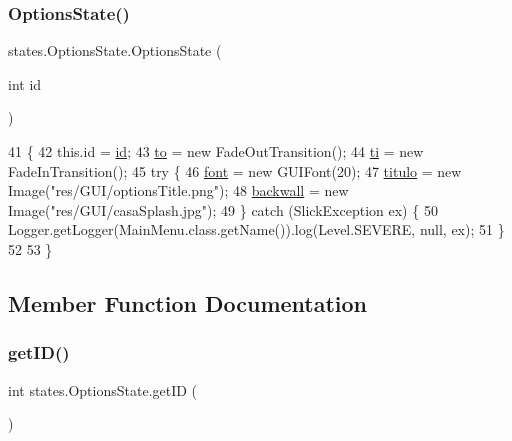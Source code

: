\subsubsection{\texorpdfstring{Options\+State()}{OptionsState()}}
{\footnotesize\ttfamily states.\+Options\+State.\+Options\+State (\begin{DoxyParamCaption}\item[{int}]{id }\end{DoxyParamCaption})\hspace{0.3cm}{\ttfamily [inline]}}


\begin{DoxyCode}
41                                 \{
42         this.\textcolor{keywordtype}{id} = \mbox{\hyperlink{classstates_1_1_options_state_a55f5f77b21511b9bb3a1c306bf81c091}{id}};
43         \mbox{\hyperlink{classstates_1_1_options_state_a2aed557634da4727c19dd8f0e90af333}{to}} = \textcolor{keyword}{new} FadeOutTransition();
44         \mbox{\hyperlink{classstates_1_1_options_state_a0b8ab7b471d09e2aa1d6e1026ed7a634}{ti}} = \textcolor{keyword}{new} FadeInTransition();
45         \textcolor{keywordflow}{try} \{
46             \mbox{\hyperlink{classstates_1_1_options_state_a6a6834f7d7a3704e0a42aac50a50ae3f}{font}} = \textcolor{keyword}{new} GUIFont(20);
47             \mbox{\hyperlink{classstates_1_1_options_state_af4b29604629c41f9baeabdde2d2daec2}{titulo}} = \textcolor{keyword}{new} Image(\textcolor{stringliteral}{"res/GUI/optionsTitle.png"});
48             \mbox{\hyperlink{classstates_1_1_options_state_a258584e2d75daa51de1788b6791cb3f7}{backwall}} = \textcolor{keyword}{new} Image(\textcolor{stringliteral}{"res/GUI/casaSplash.jpg"});
49         \} \textcolor{keywordflow}{catch} (SlickException ex) \{
50             Logger.getLogger(MainMenu.class.getName()).log(Level.SEVERE, null, ex);
51         \}
52 
53     \}
\end{DoxyCode}


\subsection{Member Function Documentation}
\mbox{\label{classstates_1_1_options_state_a8db11ba0aff06b6e7afe929599640c73}} 
\subsubsection{\texorpdfstring{get\+I\+D()}{getID()}}
{\footnotesize\ttfamily int states.\+Options\+State.\+get\+ID (\begin{DoxyParamCaption}{ }\end{DoxyParamCaption})\hspace{0.3cm}{\ttfamily [inline]}}

